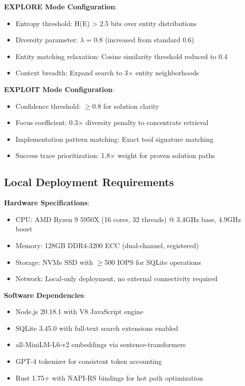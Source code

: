 \documentclass[letterpaper]{article}
\begin{document}
\textbf{EXPLORE Mode Configuration}:
\begin{itemize}
    \item Entropy threshold: H(E) > 2.5 bits over entity distributions
    \item Diversity parameter: $\lambda$ = 0.8 (increased from standard 0.6)
    \item Entity matching relaxation: Cosine similarity threshold reduced to 0.4
    \item Context breadth: Expand search to 3× entity neighborhoods
\end{itemize}

\textbf{EXPLOIT Mode Configuration}:
\begin{itemize}
    \item Confidence threshold: $\geq$0.8 for solution clarity
    \item Focus coefficient: 0.3× diversity penalty to concentrate retrieval
    \item Implementation pattern matching: Exact tool signature matching
    \item Success trace prioritization: 1.8× weight for proven solution paths
\end{itemize}

\subsection{Local Deployment Requirements}

\textbf{Hardware Specifications}:
\begin{itemize}
    \item CPU: AMD Ryzen 9 5950X (16 cores, 32 threads) @ 3.4GHz base, 4.9GHz boost
    \item Memory: 128GB DDR4-3200 ECC (dual-channel, registered)
    \item Storage: NVMe SSD with $\geq$500 IOPS for SQLite operations
    \item Network: Local-only deployment, no external connectivity required
\end{itemize}

\textbf{Software Dependencies}:
\begin{itemize}
    \item Node.js 20.18.1 with V8 JavaScript engine
    \item SQLite 3.45.0 with full-text search extensions enabled
    \item all-MiniLM-L6-v2 embeddings via sentence-transformers
    \item GPT-4 tokenizer for consistent token accounting
    \item Rust 1.75+ with NAPI-RS bindings for hot path optimization
\end{itemize}
\end{document}
